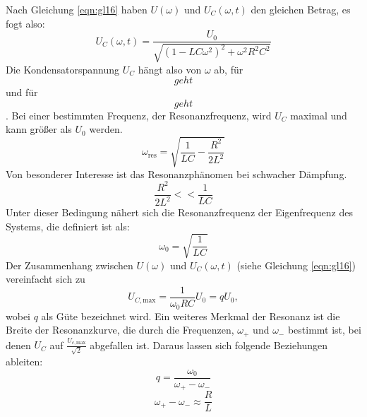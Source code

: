 Nach Gleichung \eqref{eqn:gl16} haben $U(\omega)$ und $U_C(\omega,t)$ den gleichen Betrag, es fogt also:
\begin{equation}
  U_C(\omega,t) = \frac{U_0}{\sqrt{(1 - LC\omega^2)^2 + \omega^2 R^2 C^2}}
  \label{eqn:gl19}
\end{equation}
Die Kondensatorspannung $U_C$ hängt also von $\omega$ ab, für $$ geht $$ und für $$ geht $$.
Bei einer bestimmten Frequenz, der Resonanzfrequenz, wird $U_C$ maximal und kann größer als $U_0$ werden.
\begin{equation}
  \omega_{\text{res}} = \sqrt{\frac{1}{LC} - \frac{R^2}{2L^2}}
  \label{eqn:gl20}
\end{equation}
Von besonderer Interesse ist das Resonanzphänomen bei schwacher Dämpfung.
\begin{equation*}
  \frac{R^2}{2L^2} << \frac{1}{LC}
\end{equation*}
Unter dieser Bedingung nähert sich die Resonanzfrequenz der Eigenfrequenz des Systems, die definiert ist als:
\begin{equation}
  \omega_0 = \sqrt{\frac{1}{LC}}
  \label{eqn:gl21}
\end{equation}
Der Zusammenhang zwischen $U(\omega)$ und $U_C(\omega,t)$ (siehe Gleichung \eqref{eqn:gl16}) vereinfacht sich zu
\begin{equation}
  U_{C,\text{max}} = \frac{1}{\omega_0 RC}U_0 = qU_0,
  \label{eqn:gl22}
\end{equation}
wobei $q$ als Güte bezeichnet wird.
Ein weiteres Merkmal der Resonanz ist die Breite der Resonanzkurve, die durch die Frequenzen, $\omega_+$ und $\omega_-$ bestimmt ist, bei denen $U_C$ auf $\frac{U_{c,\text{max}}}{\sqrt{2}}$ abgefallen ist.
Daraus lassen sich folgende Beziehungen ableiten:
\begin{equation}
  q = \frac{\omega_0}{\omega_+ - \omega_-}
  \label{eqn:gl23}
\end{equation}
\begin{equation}
  \omega_+ - \omega_- \approx \frac{R}{L}
  \label{eqn:gl24}
\end{equation}
